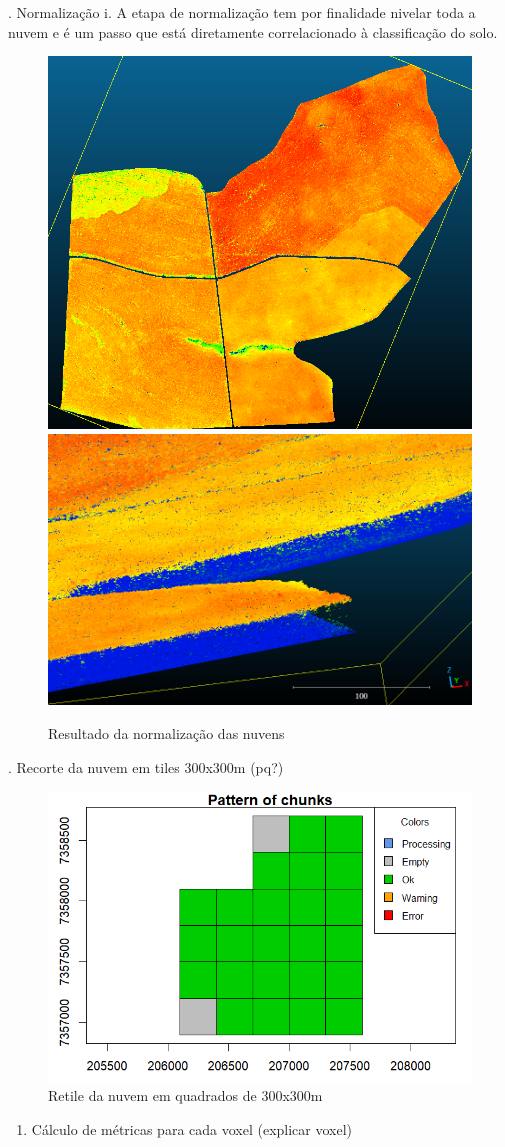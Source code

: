 \documentclass[
]{article}
\providecommand{\tightlist}{%
  \setlength{\itemsep}{0pt}\setlength{\parskip}{0pt}}
\begin{document}
. Normalização i. A etapa de normalização tem por finalidade nivelar
toda a nuvem e é um passo que está diretamente correlacionado à
classificação do solo.

\begin{figure}

{\centering \includegraphics[width=0.4\linewidth]{IMAGES/nuvensnormalizadas} \includegraphics[width=0.4\linewidth]{IMAGES/nivelamento} 

}

\caption{Resultado da normalização das nuvens}\label{fig:unnamed-chunk-12}
\end{figure}

. Recorte da nuvem em tiles 300x300m (pq?)

\begin{figure}

{\centering \includegraphics[width=0.5\linewidth]{IMAGES/Retile} 

}

\caption{Retile da nuvem em quadrados de 300x300m}\label{fig:unnamed-chunk-13}
\end{figure}
\newpage

\begin{enumerate}
\def\labelenumi{\arabic{enumi}.}
\setcounter{enumi}{10}
\tightlist
\item
  Cálculo de métricas para cada voxel (explicar voxel)
\end{enumerate}
\end{document}
